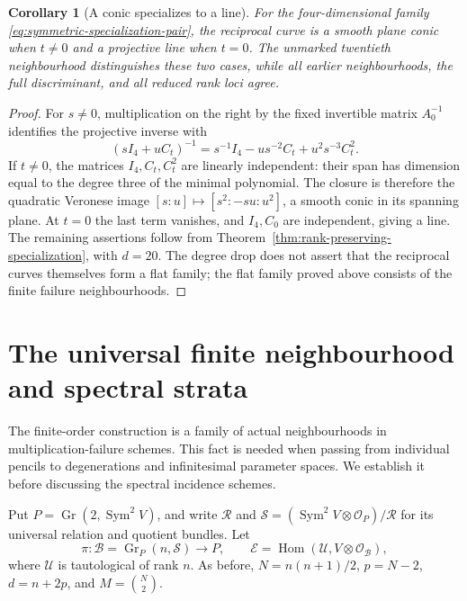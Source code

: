 \documentclass[11pt,reqno]{amsart}
\numberwithin{equation}{section}
\newtheorem{corollary}[theorem]{Corollary}
\theoremstyle{definition}\newtheorem{definition}[theorem]{Definition}
\theoremstyle{remark}\newtheorem{remark}[theorem]{Remark}
\newcommand{\OO}{\mathcal O}\newcommand{\II}{\mathcal I}
\DeclareMathOperator{\Sym}{Sym}\DeclareMathOperator{\Gr}{Gr}
\DeclareMathOperator{\Hom}{Hom}\DeclareMathOperator{\Tot}{Tot}
\begin{document}
\begin{corollary}[A conic specializes to a line]
\label{cor:reciprocal-conic-line}
For the four-dimensional family \eqref{eq:symmetric-specialization-pair},
the reciprocal curve is a smooth plane conic when \(t\ne0\)
and a projective line when \(t=0\).  The unmarked twentieth
neighbourhood distinguishes these two cases, while all earlier
neighbourhoods, the full discriminant, and all reduced rank loci agree.
\end{corollary}
\begin{proof}
For \(s\ne0\), multiplication on the right by the fixed
invertible matrix \(A_0^{-1}\) identifies the projective inverse
with
\[
 (sI_4+uC_t)^{-1}
   =s^{-1}I_4-us^{-2}C_t+u^2s^{-3}C_t^2.
\]
If \(t\ne0\), the matrices \(I_4,C_t,C_t^2\) are
linearly independent: their span has dimension equal to the degree
three of the minimal polynomial.  The closure is therefore the
quadratic Veronese image \([s:u]\mapsto[s^2:-su:u^2]\),
a smooth conic in its spanning plane.  At \(t=0\) the last term
vanishes, and \(I_4,C_0\) are independent, giving a line.
The remaining assertions follow from
Theorem~\ref{thm:rank-preserving-specialization}, with \(d=20\).
The degree drop does not assert that the reciprocal curves themselves
form a flat family; the flat family proved above consists of the
finite failure neighbourhoods.
\end{proof}


\section{The universal finite neighbourhood and spectral strata}
\label{sec:relative-spectral-strata}

The finite-order construction is a family of actual neighbourhoods in
multiplication-failure schemes.  This fact is needed when passing from
individual pencils to degenerations and infinitesimal parameter spaces.
We establish it before discussing the spectral incidence schemes.

Put \(P=\Gr(2,\Sym^2V)\), and write \(\mathcal R\) and
\(\mathcal S=(\Sym^2V\otimes\OO_P)/\mathcal R\) for its
universal relation and quotient bundles.  Let
\[
 \pi:\mathcal B=\Gr_P(n,\mathcal S)\longrightarrow P,
 \qquad \mathcal E=\Hom(\mathcal U,V\otimes\OO_{\mathcal B}),
\]
where \(\mathcal U\) is tautological of rank \(n\).  As before,
\(N=n(n+1)/2\), \(p=N-2\), \(d=n+2p\), and
\(M=\binom N2\).
\end{document}
